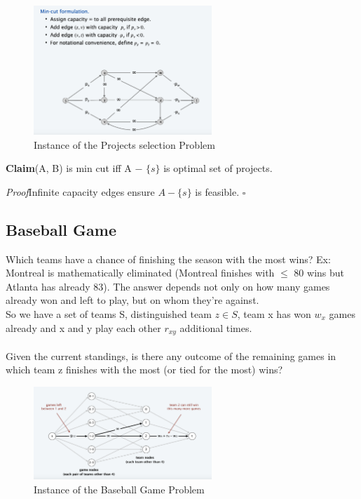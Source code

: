 \documentclass[11pt]{article}
\newenvironment{claim}[1]{\par\textbf{Claim}\space#1}{}
\newenvironment{proof}[1]{\par\textit{Proof}\space#1}{\hfill\ensuremath{\square}}
\begin{document}
\begin{figure}[H]
		\centering
		\includegraphics[width=0.6\textwidth ]{projects}
		\caption{Instance of the Projects selection Problem}
\end{figure}

\begin{claim}
(A, B) is min cut iff A − $\{ s \}$ is optimal set of projects.
\end{claim}\\

\begin{proof}
Infinite capacity edges ensure $A − \{ s \}$ is feasible.
\end{proof}

\subsection{Baseball Game}
Which teams have a chance of finishing the season with the most wins? Ex:  Montreal is mathematically eliminated (Montreal finishes with $\leq$ 80 wins but Atlanta has already 83). The answer depends not only on how many games already won and left to play, but on whom they're against.\\So we have a set of teams S, distinguished team $z \in S$, team x has won $w_{x}$ games already and x and y play each other $r_{xy}$ additional times.\\\\
Given the current standings, is there any outcome of the remaining games in which team z finishes with the most (or tied for the most) wins?

\begin{figure}[H]
		\centering
		\includegraphics[width=0.6\textwidth ]{baseballFlow}
		\caption{Instance of the Baseball Game Problem}
\end{figure}
\end{document}
